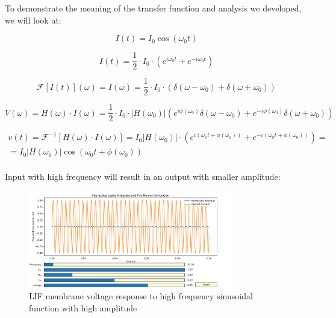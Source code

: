 To demonstrate the meaning of the transfer function and analysis we developed, we will look at:

\begin{equation}
    I(t) = I_0 \cos(\omega_0 t)
\end{equation}

\begin{equation}
    I(t) = \frac{1}{2} \cdot I_0 \cdot \left(e^{i\omega_0 t} + e^{-i\omega_0 t}\right)
\end{equation}

\begin{equation}
    \mathcal{F}[I(t)](\omega) = I(\omega) = \frac{1}{2} \cdot I_0 \cdot \left(\delta(\omega - \omega_0) + \delta(\omega + \omega_0)\right)
\end{equation}

\begin{equation}
    V(\omega) = H(\omega) \cdot I(\omega) = \frac{1}{2}  \cdot I_0 \cdot |H(\omega_0)| \left(e^{i\phi(\omega_0)} \delta(\omega - \omega_0) + e^{-i\phi(\omega_0)} \delta(\omega + \omega_0)\right)
\end{equation}

\begin{equation}
\begin{aligned}
    v(t) = \mathcal{F}^{-1}[H(\omega) \cdot I(\omega)] = I_0 |H(\omega_0)| \cdot \left(e^{i(\omega_0 t + \phi(\omega_0))} + e^{-i(\omega_0 t + \phi(\omega_0))}\right) = \\ = I_0 |H(\omega_0)| \cos(\omega_0 t + \phi(\omega_0))
\end{aligned}
\end{equation} \\

Input with high frequency will result in an output with smaller amplitude:

\begin{figure}[H]
    \centering
    \includegraphics[width=0.8\textwidth]{methods/computational-models/graphs/LIF-high-freq-sin-response.png}
    \caption{LIF membrane voltage response to high frequency sinusoidal function with high amplitude}
    \label{fig:LIF-high-freq-sin}
\end{figure}

